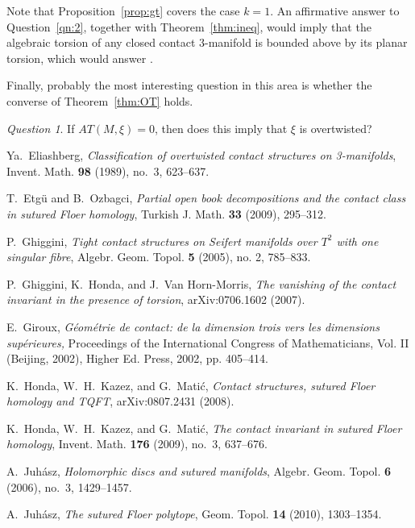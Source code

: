 \documentclass[11pt,oneside,english]{amsart}
\numberwithin{equation}{section}
\numberwithin{figure}{section}
\theoremstyle{definition}
\theoremstyle{plain}
\theoremstyle{plain}
\theoremstyle{remark}
\newtheorem{qn}{Question}
\theoremstyle{plain}
\begin{document}
Note that Proposition~\ref{prop:gt} covers the case $k = 1$.
An affirmative answer to Question~\ref{qn:2}, together with Theorem~\ref{thm:ineq}, would
imply that the algebraic torsion of any closed contact $3$-manifold
is bounded above by its planar torsion, which would answer \cite[Question~3.2]{key-10}.

Finally, probably the most interesting question in this area is whether
the converse of Theorem~\ref{thm:OT} holds.

\begin{qn}
If ${\mathit{AT}}(M,\xi) = 0$, then does this imply that $\xi$ is overtwisted? 
\end{qn}

\begin{thebibliography}{Juhï¿½sz}

 Ya.~Eliashberg, \emph{Classification
of overtwisted contact structures on 3-manifolds}, Invent.
Math. \textbf{98} (1989), no.~3, 623--637.

 T.~Etg\"u and B.~Ozbagci, \emph{Partial
open book decompositions and the contact class in sutured Floer homology},
Turkish J. Math. \textbf{33} (2009), 295--312.

 P.~Ghiggini, \emph{Tight contact
structures on Seifert manifolds over $T^2$ with one singular fibre},
Algebr. Geom. Topol. \textbf{5} (2005), no. 2, 785--833.

 P.~Ghiggini, K.~Honda, and J.~Van Horn-Morris,
\emph{The vanishing of the contact invariant in the presence
of torsion}, arXiv:0706.1602 (2007).

 E.~Giroux, \emph{G\'eom\'etrie
de contact: de la dimension trois vers les dimensions sup\'erieures,}
Proceedings of the International Congress of Mathematicians, Vol. II
(Beijing, 2002), Higher Ed. Press, 2002, pp. 405--414.

 K.~Honda, W.~H.~Kazez, and G.~Mati\'c,
\emph{Contact structures, sutured Floer homology and TQFT},
arXiv:0807.2431 (2008).

K.~Honda, W.~H.~Kazez, and G.~Mati\'{c},
\emph{The contact invariant in sutured Floer homology},
Invent. Math. \textbf{176} (2009), no.~3, 637--676.

 A.~Juh\'asz, \emph{Holomorphic
discs and sutured manifolds}, Algebr. Geom. Topol. \textbf{6} (2006),
no.~3, 1429--1457.

 A.~Juh\'asz, \emph{The sutured Floer polytope}, Geom. Topol. \textbf{14} (2010),
1303--1354.


\end{thebibliography}
\end{document}
